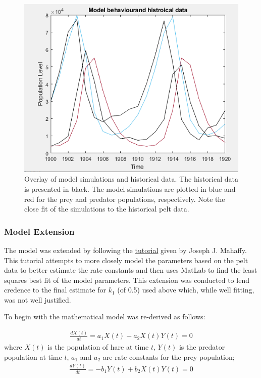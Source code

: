 \documentclass{article}
\begin{document}
\begin{figure}[H]
    \includegraphics[width = \textwidth]{results_3.PNG}
    \caption{Overlay of model simulations and historical data. The historical data is presented in black. The model simulations are plotted in blue and red for the prey and predator populations, respectively. Note the close fit of the simulations to the historical pelt data.}
    \label{fig:results_3}
\end{figure}

\subsubsection{Model Extension}
The model was extended by following the \href{https://jmahaffy.sdsu.edu/courses/f09/math636/lectures/lotka/qualde2.html}{tutorial} given by Joseph J. Mahaffy. This tutorial attempts to more closely model the parameters based on the pelt data to better estimate the rate constants and then uses MatLab to find the least squares best fit of the model parameters. This extension was conducted to lend credence to the final estimate for $k_1$ (of 0.5) used above which, while well fitting, was not well justified. 

To begin with the mathematical model was re-derived as follows: 

\begin{eqnarray*}
     \frac{dX(t)}{dt} = a_1X(t) - a_2X(t)Y(t) = 0
\end{eqnarray*}
where $X(t)$ is the population of hare at time $t$, $Y(t)$ is the predator population at time $t$, $a_1$ and $a_2$ are rate constants for the prey population;
\begin{eqnarray*}
     \frac{dY(t)}{dt} = - b_1Y(t) + b_2X(t)Y(t) = 0
\end{eqnarray*}
\end{document}
